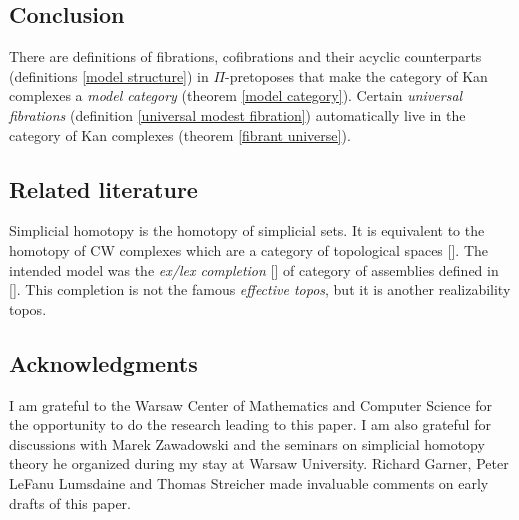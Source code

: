 \documentclass{tac}
\newcommand\citep[1]{[\cite{#1}]}
\begin{document}
\subsection*{Conclusion} There are definitions of fibrations, cofibrations and their acyclic counterparts (definitions \ref{model structure}) in $\Pi$-pretoposes that make the category of Kan complexes a \emph{model category} (theorem \ref{model category}). Certain \emph{universal fibrations} (definition \ref{universal modest fibration}) automatically live in the category of Kan complexes (theorem \ref{fibrant universe}).

\subsection*{Related literature}
Simplicial homotopy is the homotopy of simplicial sets. It is equivalent to the homotopy of CW complexes which are a category of topological spaces \citep{Hovey99,GJSHT}. The intended model was the \emph{ex/lex completion} \citep{MR1600009} of category of assemblies defined in \citep{MR1097022,MR2479466,MR1023803}. This completion is not the famous \emph{effective topos}, but it is another realizability topos. 

\subsection*{Acknowledgments} 
I am grateful to the Warsaw Center of Mathematics and Computer Science for the opportunity to do the research leading to this paper. I am also grateful for discussions with Marek Zawadowski and the seminars on simplicial homotopy theory he organized during my stay at Warsaw University. Richard Garner, Peter LeFanu Lumsdaine and Thomas Streicher made invaluable comments on early drafts of this paper.












\printbibliography
\end{document}
